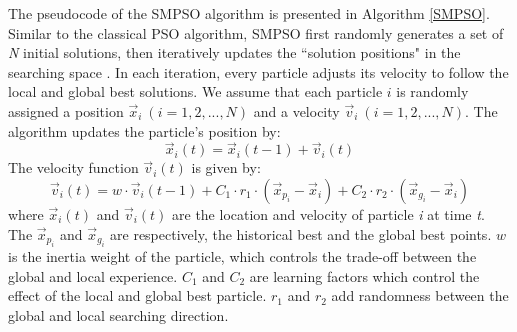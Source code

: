 \documentclass[10pt,journal,compsoc]{IEEEtran}
\begin{document}
The pseudocode of the SMPSO algorithm is presented in Algorithm \ref{SMPSO}.
Similar to the classical PSO algorithm, SMPSO first randomly generates a set of \textit{N} initial solutions, then iteratively updates the ``solution positions" in the searching space \cite{smpso}.
In each iteration, every particle adjusts its velocity to follow the local and global best solutions. We assume that each particle $i$ is randomly assigned a position $\vec{x}_i\ (i=1, 2, ..., N)$ and a velocity $\vec{v}_i\ (i=1,2,...,N)$. The algorithm updates the particle's position by:
\begin{equation}\label{psoposition}
\vec{x}_i(t) = \vec{x}_i(t-1) + \vec{v}_i(t)
\end{equation}
The velocity function $\vec{v}_i(t)$ is given by:
\begin{equation}\label{psospeed}
\vec{v}_i(t) = w \cdot \vec{v}_i(t-1) + C_1 \cdot r_1 \cdot (\vec{x}_{p_i}- \vec{x}_i)+ C_2 \cdot r_2 \cdot (\vec{x}_{g_i} - \vec{x}_i)
\end{equation}
where $\vec{x}_i(t)$ and $\vec{v}_i(t)$ are the location and velocity of particle \textit{i} at time \textit{t}. 
The $\vec{x}_{p_i}$ and $\vec{x}_{g_i}$ are respectively, the historical best and the global best points.
$w$ is the inertia weight of the particle, which controls the trade-off between the global and local experience.
$C_1$ and $C_2$ are learning factors which control the effect of the local and global best particle.
$r_1$ and $r_2 $ add randomness between the global and local searching direction.
\end{document}
